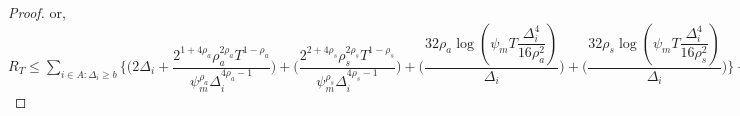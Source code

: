 \begin{proof}
\newline
or, $R_{T}\leq \sum\limits_{i\in A:\Delta_{i}\geq b} \bigg\lbrace \bigg(2\Delta_{i}+\dfrac{2^{1+4\rho_{a}}\rho_{a}^{2\rho_{a}}T^{1-\rho_{a}}}{\psi_{m}^{\rho_{a}}\Delta_{i}^{4\rho_{a}-1}}\bigg) + \bigg(\dfrac{2^{2+4\rho_{s}}\rho_{s}^{2\rho_{s}}T^{1-\rho_{s}}}{\psi_{m}^{\rho_{s}}\Delta_{i}^{4\rho_{s}-1}}\bigg) + \bigg(\dfrac{32\rho_{a}\log{(\psi_{m}T\dfrac{\Delta_{i}^{4}}{16\rho_{a}^{2}})}}{\Delta_{i}}\bigg) + \bigg(\dfrac{32\rho_{s}\log{(\psi_{m}T\dfrac{\Delta_{i}^{4}}{16\rho_{s}^{2}})}}{\Delta_{i}}\bigg)\bigg\rbrace + \sum\limits_{i\in A_{s^{*}}:0\leq\Delta_{i}\leq b}\bigg\lbrace \bigg(\dfrac{T^{1-\rho_{a}}\rho_{a}^{2\rho_{a}}2^{2\rho_{a}+\frac{3}{2}}}{\psi_{m}^{\rho_{a}}\Delta_{i}^{4\rho_{a}-1}} \bigg)+\bigg(\dfrac{T^{1-\rho_{a}}\rho_{a}^{2\rho_{a}}2^{2\rho_{a}+\frac{3}{2}}}{\psi_{m}^{\rho_{a}}b^{4\rho_{a} -1}} \bigg)\bigg\rbrace + \sum\limits_{i\in A:0\leq\Delta_{i}\leq b}\bigg\lbrace  \bigg(\dfrac{T^{1-\rho_{s}}\rho_{s}^{2\rho_{s}}2^{2\rho_{s}+3}}{\psi_{m}^{\rho_{s}}\Delta_{i}^{4\rho_{s}-1}} \bigg)+\bigg(\dfrac{T^{1-\rho_{s}}\rho_{s}^{2\rho_{s}}2^{2\rho_{s}+3}}{\psi_{m}^{\rho_{s}}b^{4\rho_{s} -1}} \bigg) \bigg\rbrace + max_{i:\Delta_{i}\leq b}\Delta_{i}T$
\end{proof}

